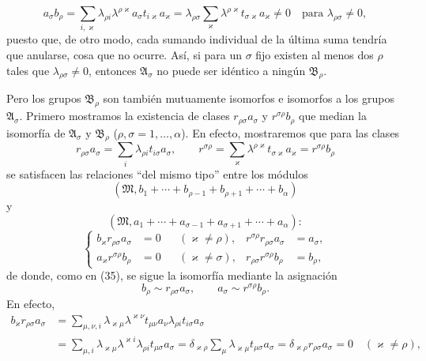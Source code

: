 \[
 a_\sigma b_\rho
 =\sum_{i,\varkappa}\lambda_{\rho i}\lambda^{\rho\varkappa}a_\sigma t_{i\varkappa}a_\varkappa
 =\lambda_{\rho\sigma}
 \sum_\varkappa\lambda^{\rho\varkappa}t_{\sigma\varkappa}a_\varkappa\ne0
 \quad\text{para }\lambda_{\rho\sigma}\ne0,
\]
puesto que, de otro modo, cada sumando individual de la última suma tendría que anularse, cosa que no ocurre. Así, si para un $\sigma$ fijo existen al menos dos $\rho$ tales que $\lambda_{\rho\sigma}\ne0$, entonces $\mathfrak A_\sigma$ no puede ser idéntico a ningún $\mathfrak B_\rho$.

Pero los grupos $\mathfrak B_\rho$ son también mutuamente isomorfos e isomorfos a los grupos $\mathfrak A_\sigma$. Primero mostramos la existencia de clases $r_{\rho\sigma}a_\sigma$ y $r^{\sigma\rho}b_\rho$ que median la isomorfía de $\mathfrak A_\sigma$ y $\mathfrak B_\rho$ ($\rho,\sigma=1,\ldots,\alpha$). En efecto, mostraremos que para las clases
\[
 r_{\rho\sigma}a_\sigma=\sum_i\lambda_{\rho i}t_{i\sigma}a_\sigma,
 \qquad
 r^{\sigma\rho}=\sum_\varkappa\lambda^{\rho\varkappa}t_{\sigma\varkappa}a_\varkappa
 =r^{\sigma\rho}b_\rho
\]
se satisfacen las relaciones ``del mismo tipo'' entre los módulos
\[
 (\mathfrak M,b_1+\cdots+b_{\rho-1}+b_{\rho+1}+\cdots+b_\alpha)
\]
y
\[
 (\mathfrak M,a_1+\cdots+a_{\sigma-1}+a_{\sigma+1}+\cdots+a_\alpha):
\]
\begin{equation}
\left\{
\begin{aligned}
 b_\varkappa r_{\rho\sigma}a_\sigma&=0 &&(\varkappa\ne\rho),&
 r^{\sigma\rho}r_{\rho\sigma}a_\sigma&=a_\sigma,\\
 a_\varkappa r^{\sigma\rho}b_\rho&=0 &&(\varkappa\ne\sigma),&
 r_{\rho\sigma}r^{\sigma\rho}b_\rho&=b_\rho,
\end{aligned}\right.
\tag{39}
\end{equation}
de donde, como en (35), se sigue la isomorfía mediante la asignación
\begin{equation}
 b_\rho\sim r_{\rho\sigma}a_\sigma,
 \qquad
 a_\sigma\sim r^{\sigma\rho}b_\rho.
\tag{40}
\end{equation}
En efecto,
\[
\begin{aligned}
 b_\varkappa r_{\rho\sigma}a_\sigma
 &=\sum_{\mu,\nu,i}\lambda_{\varkappa\mu}\lambda^{\varkappa\nu}t_{\mu\nu}a_\nu\lambda_{\rho i}t_{i\sigma}a_\sigma\\
 &=\sum_{\mu,i}\lambda_{\varkappa\mu}\lambda^{\varkappa i}\lambda_{\rho i}t_{\mu\sigma}a_\sigma
 =\delta_{\varkappa\rho}\sum_\mu\lambda_{\varkappa\mu}t_{\mu\sigma}a_\sigma
 =\delta_{\varkappa\rho}r_{\rho\sigma}a_\sigma=0\quad(\varkappa\ne\rho),
\end{aligned}
\]
